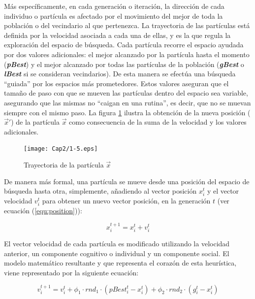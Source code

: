    M\'as espec\'ificamente, en cada generaci\'on o iteraci\'on, la direcci\'on de cada individuo o part\'icula es afectado por el movimiento 
    del mejor de toda la poblaci\'on o del vecindario al que pertenezca. La trayectoria de las part\'iculas est\'a definida
    por la velocidad asociada a cada una de ellas, y es la que regula la exploraci\'on del espacio de b\'usqueda. Cada part\'icula 
    recorre el espacio ayudada por dos valores adicionales: el mejor alcanzado por la part\'icula hasta el momento (\textbf{\textit{pBest}}) 
    y el mejor alcanzado por todas las part\'iculas de la poblaci\'on (\textbf{\textit{gBest}} o \textbf{\textit{lBest}} si se consideran 
    vecindarios). De esta manera se efect\'ua una b\'usqueda ``guiada'' por los espacios m\'as prometedores. Estos valores aseguran que 
    el tama\~no de paso con que se mueven las part\'iculas dentro del espacio sea variable, asegurando que las mismas no ``caigan en una rutina'', 
    es decir, que no se muevan siempre con el mismo paso. La figura \ref{fig:trayec} ilustra la obtenci\'on de la nueva posici\'on 
    ($\vec{x}'$) de la part\'icula $\vec{x}$ como consecuencia de la suma de la velocidad y los valores adicionales.

    \begin{figure}
	\centering
	\texttt{[image: Cap2/1-5.eps]}
	  \caption{Trayectoria de la part\'icula $\vec{x}$}
      \label{fig:trayec}
      \end{figure}
    
     De manera m\'as formal, una part\'icula se mueve desde una posici\'on del espacio de b\'usqueda hasta otra, simplemente, a\~nadiendo 
     al vector posici\'on $x^t_i$ y el vector velocidad $v^t_i$ para obtener un nuevo vector posici\'on, en la 
     generaci\'on $t$ (ver ecuaci\'on (\ref{equ:position})):
      
      \begin{equation}
	  x^{t+1}_i = x^t_i + v^t_i
      \label{equ:position}
      \end{equation}

      El vector velocidad de cada part\'icula es modificado utilizando la velocidad anterior, un componente cognitivo o individual  
      y un componente social. El modelo matem\'atico resultante y que representa el coraz\'on de esta heur\'istica, viene representado 
      por la siguiente ecuaci\'on:

      \begin{equation}
	  v^{t+1}_{i} = v^t_i + \phi_1 \cdot rnd_1 \cdot \left(pBest^t_i - x^t_i \right) 
					    + \phi_2 \cdot rnd_2 \cdot \left(g^t_i - x^t_i \right) 
      \label{equ:velocity}
      \end{equation}

